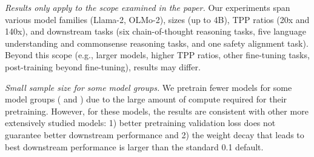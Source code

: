 \textit{Results only apply to the scope examined in the paper.}
Our experiments span various model families (Llama-2, OLMo-2), sizes (up to 4B), TPP ratios (20x and 140x), and downstream tasks (six chain-of-thought reasoning tasks, five language understanding and commonsense reasoning tasks, and one safety alignment task). Beyond this scope (e.g., larger models, higher TPP ratios, other fine-tuning tasks, post-training beyond fine-tuning), results may differ. 


\textit{Small sample size for some model groups.}
We pretrain fewer models for some model groups (\llamafourB{} and \olmosevenx{}) due to the large amount of compute required for their pretraining. However, for these models, the results are consistent with other more extensively studied models: 1) better pretraining validation loss does not guarantee better downstream performance and 2) the weight decay that leads to best downstream performance is larger than the standard 0.1 default. 